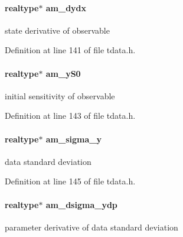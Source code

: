 \hypertarget{struct_temp_data_a062c7ecfd4107b320dfd2fc0e4211a6b}{}
\paragraph[{am\+\_\+dydx}]{\setlength{\rightskip}{0pt plus 5cm}realtype$\ast$ am\+\_\+dydx}\label{struct_temp_data_a062c7ecfd4107b320dfd2fc0e4211a6b}
state derivative of observable 

Definition at line 141 of file tdata.\+h.

\hypertarget{struct_temp_data_a7c1a4e54905d0fea6c4ec952cd7a96d8}{}
\paragraph[{am\+\_\+y\+S0}]{\setlength{\rightskip}{0pt plus 5cm}realtype$\ast$ am\+\_\+y\+S0}\label{struct_temp_data_a7c1a4e54905d0fea6c4ec952cd7a96d8}
initial sensitivity of observable 

Definition at line 143 of file tdata.\+h.

\hypertarget{struct_temp_data_ac152c0012fafda7a5ec5f2163eebfcda}{}
\paragraph[{am\+\_\+sigma\+\_\+y}]{\setlength{\rightskip}{0pt plus 5cm}realtype$\ast$ am\+\_\+sigma\+\_\+y}\label{struct_temp_data_ac152c0012fafda7a5ec5f2163eebfcda}
data standard deviation 

Definition at line 145 of file tdata.\+h.

\hypertarget{struct_temp_data_a27781d18ccc799ac0074d2dc39d51abc}{}
\paragraph[{am\+\_\+dsigma\+\_\+ydp}]{\setlength{\rightskip}{0pt plus 5cm}realtype$\ast$ am\+\_\+dsigma\+\_\+ydp}\label{struct_temp_data_a27781d18ccc799ac0074d2dc39d51abc}
parameter derivative of data standard deviation 

